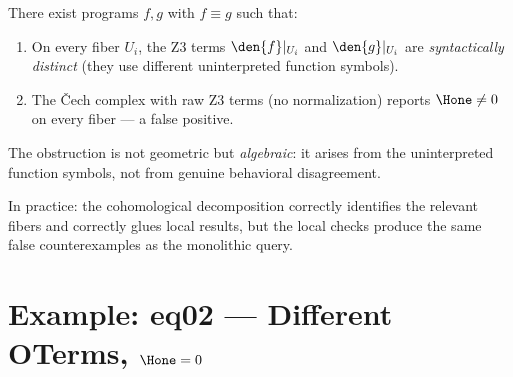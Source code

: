 \begin{proposition}
\label{prop:coh-incomplete}
There exist programs $f, g$ with $f \equiv g$ such that:
\begin{enumerate}
  \item On every fiber $U_i$, the Z3 terms $\den{f}|_{U_i}$ and
    $\den{g}|_{U_i}$ are \emph{syntactically distinct} (they use
    different uninterpreted function symbols).
  \item The \v{C}ech complex with raw Z3 terms (no normalization)
    reports $\Hone \neq 0$ on every fiber --- a false positive.
\end{enumerate}
The obstruction is not geometric but \emph{algebraic}: it arises
from the uninterpreted function symbols, not from genuine behavioral
disagreement.
\end{proposition}

In practice: the cohomological decomposition correctly identifies the
relevant fibers and correctly glues local results, but the local
checks produce the same false counterexamples as the monolithic query.

\section{Example: eq02 --- Different OTerms, $\Hone = 0$}


